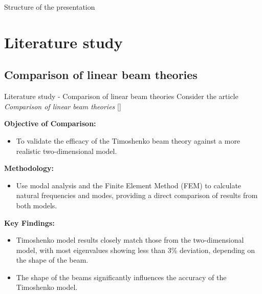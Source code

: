 \documentclass[8pt]{beamer}
\begin{document}
    \begin{frame}{Structure of the presentation}
        \tableofcontents
    \end{frame}

\section{Literature study}
    \subsection{Comparison of linear beam theories}
        \begin{frame}{Literature study - Comparison of linear beam theories}
            Consider the article \textit{Comparison of linear beam theories} [\cite{LVV09}]
            
            \textbf{Objective of Comparison:}
            \begin{itemize}
              \item To validate the efficacy of the Timoshenko beam theory against a more realistic two-dimensional model.
            \end{itemize}
            
            \textbf{Methodology:}
            \begin{itemize}
              \item Use modal analysis and the Finite Element Method (FEM) to calculate natural frequencies and modes, providing a direct comparison of results from both models.
            \end{itemize}
            
            \textbf{Key Findings:}
            \begin{itemize}
              \item Timoshenko model results closely match those from the two-dimensional model, with most eigenvalues showing less than 3\% deviation, depending on the shape of the beam.
              \item The shape of the beams significantly influences the accuracy of the Timoshenko model.
            \end{itemize}

        \end{frame}
            
\end{document}
